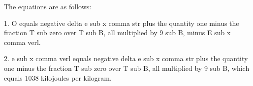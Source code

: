 The equations are as follows:

1. O equals negative delta e sub x comma str plus the quantity one minus the fraction T sub zero over T sub B, all multiplied by 9 sub B, minus E sub x comma verl.

2. e sub x comma verl equals negative delta e sub x comma str plus the quantity one minus the fraction T sub zero over T sub B, all multiplied by 9 sub B, which equals 1038 kilojoules per kilogram.